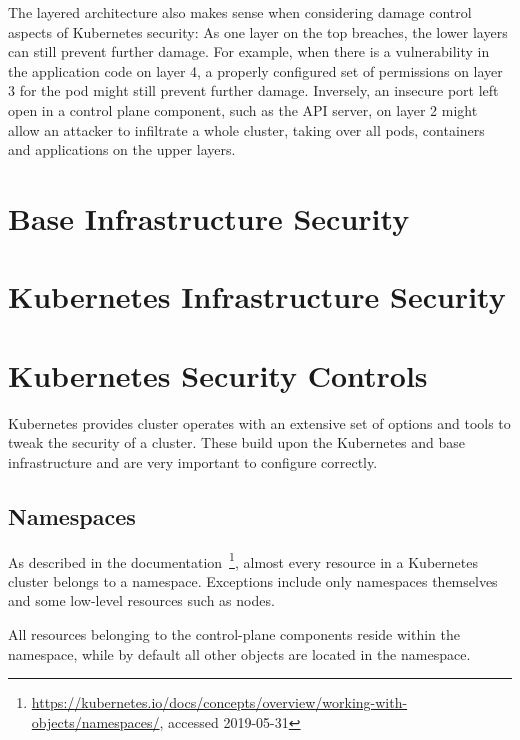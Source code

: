 The layered architecture also makes sense when considering damage control aspects of Kubernetes security: As one layer on the top breaches, the lower layers can still prevent further damage. For example, when there is a vulnerability in the application code on layer 4, a properly configured set of permissions on layer 3 for the pod might still prevent further damage. Inversely, an insecure port left open in a control plane component, such as the API server, on layer 2 might allow an attacker to infiltrate a whole cluster, taking over all pods, containers and applications on the upper layers. 
	
\section{Base Infrastructure Security} \label{sec:layer1}


\section{Kubernetes Infrastructure Security} \label{sec:layer2}


\section{Kubernetes Security Controls} \label{sec:layer3}

Kubernetes provides cluster operates with an extensive set of options and tools to tweak the security of a cluster. These build upon the Kubernetes and base infrastructure and are very important to configure correctly. 

\subsection{Namespaces} \label{sec:namespaces}

As described in the documentation~\textcite{k8sdocs}\footnote{\url{https://kubernetes.io/docs/concepts/overview/working-with-objects/namespaces/}, accessed 2019-05-31}, almost every resource in a Kubernetes cluster belongs to a namespace. Exceptions include only namespaces themselves and some low-level resources such as nodes. 

All resources belonging to the control-plane components reside within the  namespace, while by default all other objects are located in the  namespace. 

